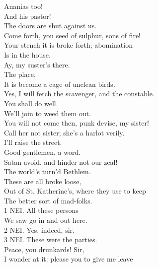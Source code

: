 \documentclass{memoir}
\begin{document}
\begin{drama*}
\facespeaks {} Ananias too!\\
 And his pastor!\\
\tribulationspeaks {} The doors are shut against us.\\
\ananiasspeaks {} Come forth, you seed of sulphur, sons of fire!\\
 Your stench it is broke forth; abomination\\
 Is in the house.\\
\kastrilspeaks {} Ay, my suster's there.\\
\ananiasspeaks {} The place,\\
 It is become a cage of unclean birds.\\
\kastrilspeaks  Yes, I will fetch the scavenger, and the constable.\\
\tribulationspeaks  You shall do well.\\
\ananiasspeaks {} We'll join to weed them out.\\
\kastrilspeaks  You will not come then, punk devise, my sister!\\
\ananiasspeaks  Call her not sister; she's a harlot verily.\\
\kastrilspeaks  I'll raise the street.\\
\lovewitspeaks {} Good gentlemen, a word.\\
\ananiasspeaks  Satan avoid, and hinder not our zeal!\\
\lovewitspeaks  The world's turn'd Bethlem.\\
\facespeaks {} These are all broke loose,\\
 Out of St. Katherine's, where they use to keep\\
 The better sort of mad-folks.\\
1 NEI. All these persons\\
 We saw go in and out here.\\
2 NEI. Yes, indeed, sir.\\
3 NEI. These were the parties.\\
\facespeaks {} Peace, you drunkards! Sir,\\
 I wonder at it: please you to give me leave\\

\end{drama*}
\end{document}
